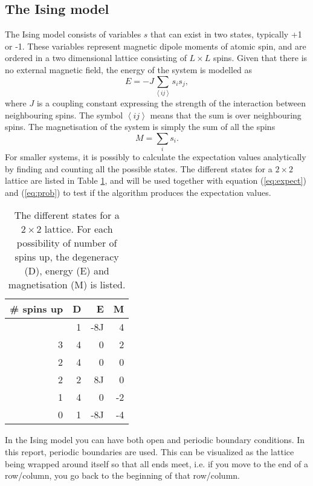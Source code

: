 \subsection{The Ising model}
The Ising model consists of variables $s$ that can exist in two states, typically +1 or -1. These variables represent magnetic dipole moments of atomic spin, and are ordered in a two dimensional lattice consisting of $L\times L$ spins. Given that there is no external magnetic field, the energy of the system is modelled as
\begin{equation}
E = -J\sum_{\left\langle ij\right\rangle } s_is_j,
\end{equation} 
where $J$ is a coupling constant expressing the strength of the interaction between neighbouring spins. The symbol $\left\langle ij\right\rangle$ means that the sum is over neighbouring spins. The magnetisation of the system is simply the sum of all the spins 
\begin{equation}
M = \sum_i s_i.
\end{equation}
For smaller systems, it is possibly to calculate the expectation values analytically by finding and counting all the possible states. The different states for a $2\times 2$ lattice are listed in Table \ref{tab:L2 values}, and will be used together with equation (\ref{eq:expect}) and (\ref{eq:prob}) to test if the algorithm produces the expectation values.
\begin{table}[htbp]
	\centering
	\begin{tabular}{rrrr}
		\# spins up & D & E & M \\
		\hline
		\addlinespace[0.1cm]
		4                   & 1          & -8J    & 4             \\
		3                   & 4          & 0      & 2             \\
		2                   & 4          & 0      & 0             \\
		2                   & 2          & 8J     & 0             \\
		1                   & 4          & 0      & -2            \\
		0                   & 1          & -8J    & -4           
	\end{tabular}
	\caption{The different states for a $2\times 2$ lattice. For each possibility of number of spins up, the degeneracy (D), energy (E) and magnetisation (M) is listed.}
	\label{tab:L2 values}
\end{table}

In the Ising model you can have both open and periodic boundary conditions. In this report, periodic boundaries are used. This can be visualized as the lattice being wrapped around itself so that all ends meet, i.e. if you move to the end of a row/column, you go back to the beginning of that row/column. 


